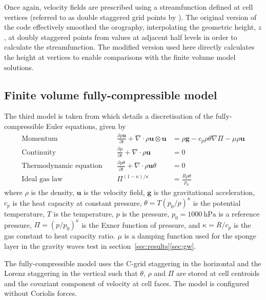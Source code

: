 \documentclass{ametsoc}
\begin{document}
Once again, velocity fields are prescribed using a streamfunction defined at cell vertices (referred to as double staggered grid points by \citet{schaer2002}).  The original version of the code effectively smoothed the orography, interpolating the geometric height, $z$, at doubly staggered points from values at adjacent half levels in order to calculate the streamfunction.  The modified version used here directly calculates the height at vertices to enable comparisons with the finite volume model solutions.

\subsection{Finite volume fully-compressible model}
\label{sec:euler-model}
The third model is taken from \citet{weller-shahrokhi2014} which details a discretisation of the fully-compressible Euler equations, given by
\begin{subequations}
\begin{align}
	\text{Momentum} &\ &\  	\frac{\partial \rho \mathbf{u}}{\partial t} + \nabla \cdot \rho \mathbf{u}\otimes\mathbf{u} &= \rho \mathbf{g} - c_p \rho \theta \nabla \Pi - \mu \rho \mathbf{u} \label{eq:momentum} \\
	\text{Continuity} &\ &\	\frac{\partial \rho}{\partial t} + \nabla \cdot \rho \mathbf{u} &= 0 \label{eq:cont} \\
	\text{Thermodynamic equation} &\ &\ \frac{\partial \rho \theta}{\partial t} + \nabla \cdot \rho \mathbf{u} \theta &= 0 \label{eq:theta} \\
	\text{Ideal gas law} &\ &\ \Pi^{(1 - \kappa)/\kappa} &= \frac{R \rho \theta}{p_0} \label{eq:state}
\end{align}
\end{subequations}
where \(\rho\) is the density, \(\mathbf{u}\) is the velocity field, \(\mathbf{g}\) is the gravitational acceleration, \(c_p\) is the heat capacity at constant pressure, \(\theta = T \left(p_0/p\right)^\kappa\) is the potential temperature, \(T\) is the temperature, \(p\) is the pressure, \(p_0 = \SI{1000}{\hecto\pascal}\) is a reference pressure, \(\Pi = \left(p / p_0 \right)^\kappa\) is the Exner function of pressure, and \(\kappa = R/c_p\) is the gas constant to heat capacity ratio.  \(\mu\) is a damping function used for the sponge layer in the gravity waves test in section~\ref{sec:results}\ref{sec:gw}.

The fully-compressible model uses the C-grid staggering in the horizontal and the Lorenz staggering in the vertical such that $\theta$, $\rho$ and $\Pi$ are stored at cell centroids and the covariant component of velocity at cell faces.  The model is configured without Coriolis forces.
\end{document}
